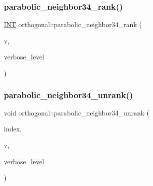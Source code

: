 \mbox{\label{classorthogonal_ae4164e3cd3214b07c243ad7c048a254b}} 
\subsubsection{\texorpdfstring{parabolic\+\_\+neighbor34\+\_\+rank()}{parabolic\_neighbor34\_rank()}}
{\footnotesize\ttfamily \mbox{\hyperlink{galois_8h_a09fddde158a3a20bd2dcadb609de11dc}{I\+NT}} orthogonal\+::parabolic\+\_\+neighbor34\+\_\+rank (\begin{DoxyParamCaption}\item[{\mbox{\hyperlink{galois_8h_a09fddde158a3a20bd2dcadb609de11dc}{I\+NT}} $\ast$}]{v,  }\item[{\mbox{\hyperlink{galois_8h_a09fddde158a3a20bd2dcadb609de11dc}{I\+NT}}}]{verbose\+\_\+level }\end{DoxyParamCaption})}

\mbox{\label{classorthogonal_ab6f296f57c8900a1154b1bd5a06c3457}} 
\subsubsection{\texorpdfstring{parabolic\+\_\+neighbor34\+\_\+unrank()}{parabolic\_neighbor34\_unrank()}}
{\footnotesize\ttfamily void orthogonal\+::parabolic\+\_\+neighbor34\+\_\+unrank (\begin{DoxyParamCaption}\item[{\mbox{\hyperlink{galois_8h_a09fddde158a3a20bd2dcadb609de11dc}{I\+NT}}}]{index,  }\item[{\mbox{\hyperlink{galois_8h_a09fddde158a3a20bd2dcadb609de11dc}{I\+NT}} $\ast$}]{v,  }\item[{\mbox{\hyperlink{galois_8h_a09fddde158a3a20bd2dcadb609de11dc}{I\+NT}}}]{verbose\+\_\+level }\end{DoxyParamCaption})}

\mbox{\label{classorthogonal_ac088ee6a73b26e7ad1bbf8e25b14b87a}} 
